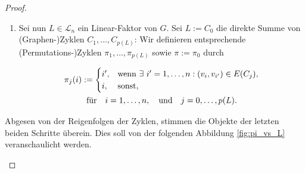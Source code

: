 \begin{proof}
\begin{enumerate}[label = \arabic*.]
                    \item Sei nun $L \in \mathcal L_n$ ein Linear-Faktor von $G$.
                    Sei $L := C_0$ die direkte Summe von (Graphen-)Zyklen $C_1, \dots, C_{p(L)}$:
                    Wir definieren entsprechende (Permutations-)Zyklen $\pi_1, \dots, \pi_{p(L)}$ sowie $\pi := \pi_0$ durch

                    \begin{multline*}
                        \pi_j(i)
                        :=
                        \begin{cases}
                            i^\prime, & \text{wenn} ~ \exists ~ i^\prime = 1, \dots, n: (v_i, v_{i^\prime}) \in E(C_j), \\
                            i,        & \text{sonst},
                        \end{cases} \\
                        \text{für}
                        \quad
                        i = 1, \dots, n,
                        \quad
                        \text{und}
                        \quad
                        j = 0, \dots, p(L).
                    \end{multline*}

                \end{enumerate}

                Abgesen von der Reigenfolgen der Zyklen, stimmen die Objekte der letzten beiden Schritte überein.
                Dies soll von der folgenden Abbildung \ref{fig:pi_vs_L} veranschaulicht werden.

                \begin{figure}[h!]
                    \centering
\end{figure}
\end{proof}

